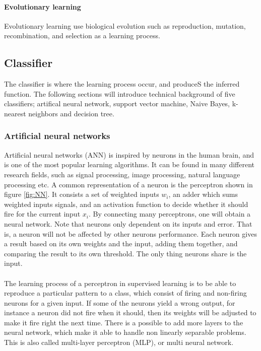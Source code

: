 \documentclass[USenglish]{ifimaster}  %
\begin{document}
\paragraph{Evolutionary learning}
Evolutionary learning use biological evolution such as reproduction, mutation, recombination, and selection as a learning process. 
	
 \subsection{Classifier} \label{sub:classifier}
The classifier is where the learning process occur, and produceS the inferred function. The following sections will introduce technical background of five classifiers; artifical neural network, support vector machine, Naive Bayes, k-nearest neighbors and decision tree.

\subsubsection{Artificial neural networks}
Artificial neural networks (ANN) is inspired by neurons in the human brain, and is one of the most popular learning algorithms. It can be found in many different research fields, such as signal processing, image processing, natural language processing etc. A common representation of a neuron is the perceptron shown in figure \ref{fig:NN}. It consists a set of weighted inputs $w_i$, an adder which sums weighted inputs signals, and an activation function to decide whether it should fire for the current input $x_i$. By connecting many perceptrons, one will obtain a neural network. Note that neurons only dependent on its inputs and error. That is, a neuron will not be affected by other neurons performance. Each neuron gives a result based on its own weights and the input, adding them together, and comparing the result to its own threshold. The only thing neurons share is the input. 
\\
\\
The learning process of a perceptron in supervised learning is to be able to reproduce a particular pattern to a class, which consist of firing and non-firing neurons for a given input. If some of the neurons yield a wrong output, for instance a neuron did not fire when it should, then its weights will be adjusted to make it fire right the next time. There is a possible to add more layers to the neural network, which make it able to handle non linearly separable problems. This is also called multi-layer perceptron (MLP), or multi neural network.
\end{document}
